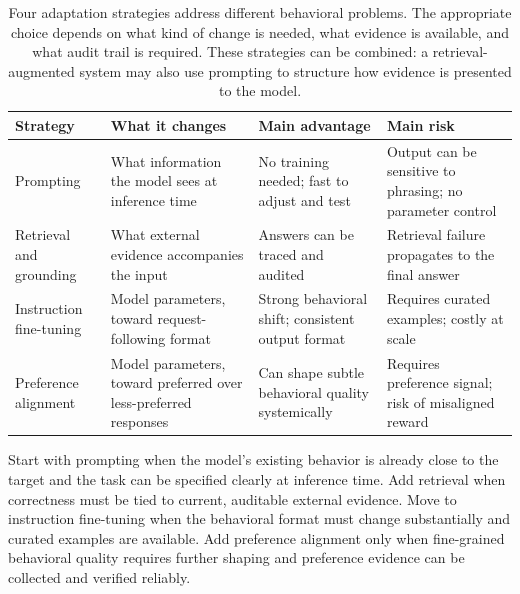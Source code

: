 \begin{table}[t]
\centering
\small
\setlength{\tabcolsep}{4pt}
\begin{tabular}{p{2.13cm}p{2.95cm}p{2.29cm}p{2.29cm}}
\toprule
Strategy & What it changes & Main advantage & Main risk \\
\midrule
Prompting & What information the model sees at inference time & No training needed; fast to adjust and test & Output can be sensitive to phrasing; no parameter control \\
Retrieval and grounding & What external evidence accompanies the input & Answers can be traced and audited & Retrieval failure propagates to the final answer \\
Instruction fine-tuning & Model parameters, toward request-following format & Strong behavioral shift; consistent output format & Requires curated examples; costly at scale \\
Preference alignment & Model parameters, toward preferred over less-preferred responses & Can shape subtle behavioral quality systemically & Requires preference signal; risk of misaligned reward \\
\bottomrule
\end{tabular}
\caption{Four adaptation strategies address different behavioral problems. The appropriate choice depends on what kind of change is needed, what evidence is available, and what audit trail is required. These strategies can be combined: a retrieval-augmented system may also use prompting to structure how evidence is presented to the model.}
\label{tab:adaptation-strategy-choice}
\end{table}

\begin{decisionbox}
Start with prompting when the model's existing behavior is already close to the target and the task can be specified clearly at inference time. Add retrieval when correctness must be tied to current, auditable external evidence. Move to instruction fine-tuning when the behavioral format must change substantially and curated examples are available. Add preference alignment only when fine-grained behavioral quality requires further shaping and preference evidence can be collected and verified reliably.
\end{decisionbox}

